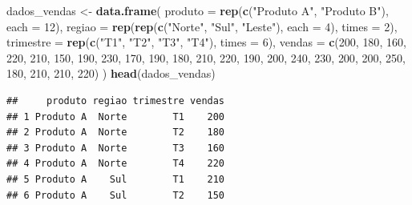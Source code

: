 \documentclass[
]{book}
\newenvironment{Shaded}{\begin{snugshade}}{\end{snugshade}}
\newcommand{\AttributeTok}[1]{\textcolor[rgb]{0.13,0.29,0.53}{#1}}
\newcommand{\DecValTok}[1]{\textcolor[rgb]{0.00,0.00,0.81}{#1}}
\newcommand{\FunctionTok}[1]{\textcolor[rgb]{0.13,0.29,0.53}{\textbf{#1}}}
\newcommand{\NormalTok}[1]{#1}
\newcommand{\OtherTok}[1]{\textcolor[rgb]{0.56,0.35,0.01}{#1}}
\newcommand{\StringTok}[1]{\textcolor[rgb]{0.31,0.60,0.02}{#1}}
\begin{document}
\begin{Shaded}
\begin{Highlighting}[]
\NormalTok{dados\_vendas }\OtherTok{\textless{}{-}} \FunctionTok{data.frame}\NormalTok{(}
  \AttributeTok{produto =} \FunctionTok{rep}\NormalTok{(}\FunctionTok{c}\NormalTok{(}\StringTok{"Produto A"}\NormalTok{, }\StringTok{"Produto B"}\NormalTok{), }\AttributeTok{each =} \DecValTok{12}\NormalTok{),}
  \AttributeTok{regiao =} \FunctionTok{rep}\NormalTok{(}\FunctionTok{rep}\NormalTok{(}\FunctionTok{c}\NormalTok{(}\StringTok{"Norte"}\NormalTok{, }\StringTok{"Sul"}\NormalTok{, }\StringTok{"Leste"}\NormalTok{), }\AttributeTok{each =} \DecValTok{4}\NormalTok{), }\AttributeTok{times =} \DecValTok{2}\NormalTok{),}
  \AttributeTok{trimestre =} \FunctionTok{rep}\NormalTok{(}\FunctionTok{c}\NormalTok{(}\StringTok{"T1"}\NormalTok{, }\StringTok{"T2"}\NormalTok{, }\StringTok{"T3"}\NormalTok{, }\StringTok{"T4"}\NormalTok{), }\AttributeTok{times =} \DecValTok{6}\NormalTok{),}
  \AttributeTok{vendas =} \FunctionTok{c}\NormalTok{(}\DecValTok{200}\NormalTok{, }\DecValTok{180}\NormalTok{, }\DecValTok{160}\NormalTok{, }\DecValTok{220}\NormalTok{, }\DecValTok{210}\NormalTok{, }\DecValTok{150}\NormalTok{, }\DecValTok{190}\NormalTok{, }\DecValTok{230}\NormalTok{, }\DecValTok{170}\NormalTok{, }\DecValTok{190}\NormalTok{, }\DecValTok{180}\NormalTok{, }\DecValTok{210}\NormalTok{,}
             \DecValTok{220}\NormalTok{, }\DecValTok{190}\NormalTok{, }\DecValTok{200}\NormalTok{, }\DecValTok{240}\NormalTok{, }\DecValTok{230}\NormalTok{, }\DecValTok{200}\NormalTok{, }\DecValTok{200}\NormalTok{, }\DecValTok{250}\NormalTok{, }\DecValTok{180}\NormalTok{, }\DecValTok{210}\NormalTok{, }\DecValTok{210}\NormalTok{, }\DecValTok{220}\NormalTok{)}
\NormalTok{)}
\FunctionTok{head}\NormalTok{(dados\_vendas)}
\end{Highlighting}
\end{Shaded}

\begin{verbatim}
##     produto regiao trimestre vendas
## 1 Produto A  Norte        T1    200
## 2 Produto A  Norte        T2    180
## 3 Produto A  Norte        T3    160
## 4 Produto A  Norte        T4    220
## 5 Produto A    Sul        T1    210
## 6 Produto A    Sul        T2    150
\end{verbatim}
\end{document}
